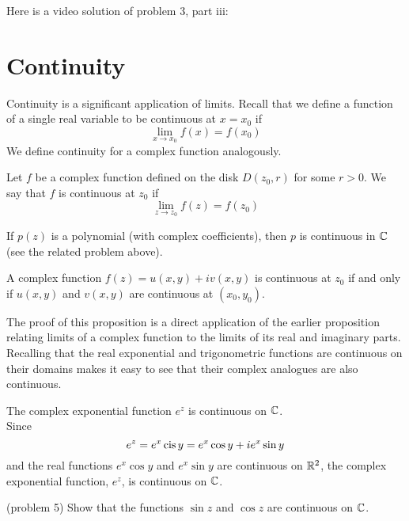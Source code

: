 \documentclass[handout]{ximera}
\begin{document}
Here is a video solution of problem 3, part iii:\\
\begin{foldable}
\end{foldable}

\section{Continuity}
Continuity is a significant application of limits. Recall that we define a function of a single real 
variable to be continuous at $x = x_0$
if 
\[
\lim_{x \to x_0} f(x) = f(x_0)
\]
We define continuity for a complex function analogously.

\begin{definition}
Let $f$ be a complex function defined on the disk $D(z_0, r)$ for some $r>0$. We say that $f$ is continuous at $z_0$ if
\[
\lim_{z \to z_0} f(z) = f(z_0)
\]
\end{definition}

\begin{example}[example 4]
If $p(z)$ is a polynomial (with complex coefficients), then $p$ is continuous in $\mathbb C$ (see the related problem above).
\end{example}

\begin{proposition}
A complex function $f(z) = u(x,y) + iv(x,y)$ is continuous at $z_0$ if and only if
$u(x,y)$ and $v(x,y)$ are continuous at $(x_0,y_0)$.
\end{proposition}

The proof of this proposition is a direct application of the earlier proposition relating limits 
of a complex function to the limits of its real and imaginary parts.\\
Recalling that the real exponential and trigonometric functions are continuous on their domains makes it easy to see that their complex analogues are also continuous.

\begin{example}[example 5]
The complex exponential function $e^z$ is continuous on $\mathbb C$.\\
Since
\[
e^z = e^x \operatorname{cis} y = e^x \cos y + ie^x \sin y
\]
and the real functions $e^x \cos y$ and $e^x \sin y$ are continuous on $\mathbb R^2$,
the complex exponential function, $e^z$, is continuous on $\mathbb C$.
\end{example}

\begin{problem}(problem 5)
Show that the functions $\sin z$ and $\cos z$ are continuous on $\mathbb C$.
\end{problem}
\end{document}

